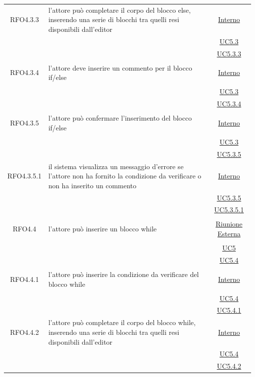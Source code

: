 \begin{itemize}
\begin{itemize}
\begin{itemize}
\begin{itemize}
\begin{longtable}{|c|>{\centering}m{7cm}|c|}
\hypertarget{RFO4.3.3}{RFO4.3.3} & l'attore può completare il corpo del blocco else, inserendo una serie di blocchi tra quelli resi disponibili dall'editor   &\hyperlink{Interno}{Interno}\\
& &\hyperref[UC5.3]{UC5.3}\\
& &\hyperref[UC5.3.3]{UC5.3.3}\\ \hline

\hypertarget{RFO4.3.4}{RFO4.3.4} & l'attore deve inserire un commento per il blocco if/else & \hyperlink{Interno}{Interno}\\
& &\hyperref[UC5.3]{UC5.3}\\
& &\hyperref[UC5.3.4]{UC5.3.4}\\ \hline

\hypertarget{RFO4.3.5}{RFO4.3.5} & l'attore può confermare l'inserimento del blocco if/else & \hyperlink{Interno}{Interno}\\
& &\hyperref[UC5.3]{UC5.3}\\
& &\hyperref[UC5.3.5]{UC5.3.5}\\ \hline

\hypertarget{RFO4.3.5.1}{RFO4.3.5.1} & il sistema visualizza un messaggio d'errore se l'attore non ha fornito la condizione da verificare o non ha inserito un commento & \hyperlink{Interno}{Interno}\\
& &\hyperref[UC5.3.5]{UC5.3.5}\\
& &\hyperref[UC5.3.5.1]{UC5.3.5.1}\\ \hline

\hypertarget{RFO4.4}{RFO4.4} & l'attore può inserire un blocco while & \hyperlink{Riunione Esterna}{Riunione Esterna}\\
& &\hyperref[UC5]{UC5}\\
& &\hyperref[UC5.4]{UC5.4}\\ \hline

\hypertarget{RFO4.4.1}{RFO4.4.1} & l'attore può inserire la condizione da verificare del blocco while & \hyperlink{Interno}{Interno}\\
& &\hyperref[UC5.4]{UC5.4}\\
& &\hyperref[UC5.4.1]{UC5.4.1}\\ \hline

\hypertarget{RFO4.4.2}{RFO4.4.2} & l'attore può completare il corpo del blocco while, inserendo una serie di blocchi tra quelli resi disponibili dall'editor & \hyperlink{Interno}{Interno}\\
& &\hyperref[UC5.4]{UC5.4}\\
& &\hyperref[UC5.4.2]{UC5.4.2}\\ \hline


\end{longtable}
\end{itemize}
\end{itemize}
\end{itemize}
\end{itemize}
